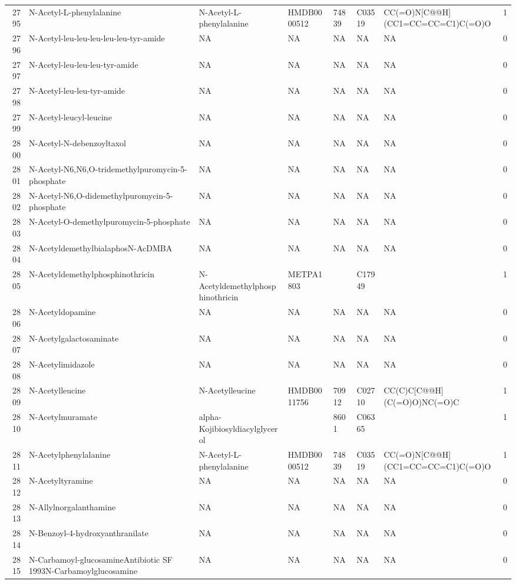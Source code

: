 \documentclass[a4paper]{article}
\begin{document}
\begin{longtable}{rlllllll}
  2795 & N-Acetyl-L-phenylalanine & N-Acetyl-L-phenylalanine & HMDB0000512 & 74839 & C03519 & CC(=O)N[C@@H](CC1=CC=CC=C1)C(=O)O & 1 \\ 
  2796 & N-Acetyl-leu-leu-leu-leu-leu-tyr-amide & NA & NA & NA & NA & NA & 0 \\ 
  2797 & N-Acetyl-leu-leu-leu-tyr-amide & NA & NA & NA & NA & NA & 0 \\ 
  2798 & N-Acetyl-leu-leu-tyr-amide & NA & NA & NA & NA & NA & 0 \\ 
  2799 & N-Acetyl-leucyl-leucine & NA & NA & NA & NA & NA & 0 \\ 
  2800 & N-Acetyl-N-debenzoyltaxol & NA & NA & NA & NA & NA & 0 \\ 
  2801 & N-Acetyl-N6,N6,O-tridemethylpuromycin-5-phosphate & NA & NA & NA & NA & NA & 0 \\ 
  2802 & N-Acetyl-N6,O-didemethylpuromycin-5-phosphate & NA & NA & NA & NA & NA & 0 \\ 
  2803 & N-Acetyl-O-demethylpuromycin-5-phosphate & NA & NA & NA & NA & NA & 0 \\ 
  2804 & N-AcetyldemethylbialaphosN-AcDMBA & NA & NA & NA & NA & NA & 0 \\ 
  2805 & N-Acetyldemethylphosphinothricin & N-Acetyldemethylphosphinothricin & METPA1803 &  & C17949 &  & 1 \\ 
  2806 & N-Acetyldopamine & NA & NA & NA & NA & NA & 0 \\ 
  2807 & N-Acetylgalactosaminate & NA & NA & NA & NA & NA & 0 \\ 
  2808 & N-Acetylimidazole & NA & NA & NA & NA & NA & 0 \\ 
  2809 & N-Acetylleucine & N-Acetylleucine & HMDB0011756 & 70912 & C02710 & CC(C)C[C@@H](C(=O)O)NC(=O)C & 1 \\ 
  2810 & N-Acetylmuramate & alpha-Kojibiosyldiacylglycerol &  & 8601 & C06365 &  & 1 \\ 
  2811 & N-Acetylphenylalanine & N-Acetyl-L-phenylalanine & HMDB0000512 & 74839 & C03519 & CC(=O)N[C@@H](CC1=CC=CC=C1)C(=O)O & 1 \\ 
  2812 & N-Acetyltyramine & NA & NA & NA & NA & NA & 0 \\ 
  2813 & N-Allylnorgalanthamine & NA & NA & NA & NA & NA & 0 \\ 
  2814 & N-Benzoyl-4-hydroxyanthranilate & NA & NA & NA & NA & NA & 0 \\ 
  2815 & N-Carbamoyl-glucosamineAntibiotic SF 1993N-Carbamoylglucosamine & NA & NA & NA & NA & NA & 0 \\ 

\end{longtable}
\end{document}
